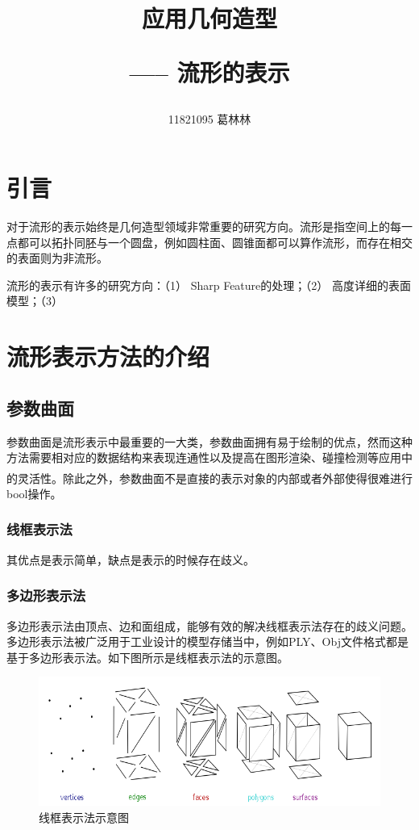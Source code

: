 \documentclass[11pt]{article}
\title{应用几何造型 \hspace{2pt}\hspace{2pt} \begin{large}----- \hspace{2pt}  流形的表示\end{large} }
\author{11821095 葛林林}
\newcommand{\upcite}[1]{\textsuperscript{\textsuperscript{\cite{#1}}}}
\begin{document}
\maketitle
\section{引言}
对于流形的表示始终是几何造型领域非常重要的研究方向。流形是指空间上的每一点都可以拓扑同胚与一个圆盘，例如圆柱面、圆锥面都可以算作流形，而存在相交的表面则为非流形。

流形的表示有许多的研究方向：（1） Sharp Feature的处理；（2） 高度详细的表面模型；（3）
\section{流形表示方法的介绍}
\subsection{参数曲面}
参数曲面是流形表示中最重要的一大类，参数曲面拥有易于绘制的优点，然而这种方法需要相对应的数据结构来表现连通性以及提高在图形渲染、碰撞检测等应用中的灵活性\upcite{ADFs}。除此之外，参数曲面不是直接的表示对象的内部或者外部使得很难进行bool操作。
\subsubsection{线框表示法} 其优点是表示简单，缺点是表示的时候存在歧义。
\subsubsection{多边形表示法}多边形表示法由顶点、边和面组成，能够有效的解决线框表示法存在的歧义问题。多边形表示法被广泛用于工业设计的模型存储当中，例如PLY、Obj文件格式都是基于多边形表示法。如下图所示是线框表示法的示意图。
\begin{figure}[H]
\begin{center}
\includegraphics[scale=0.5]{polygon.png}
\end{center}
\caption{线框表示法示意图}
\end{figure}
\end{document}
